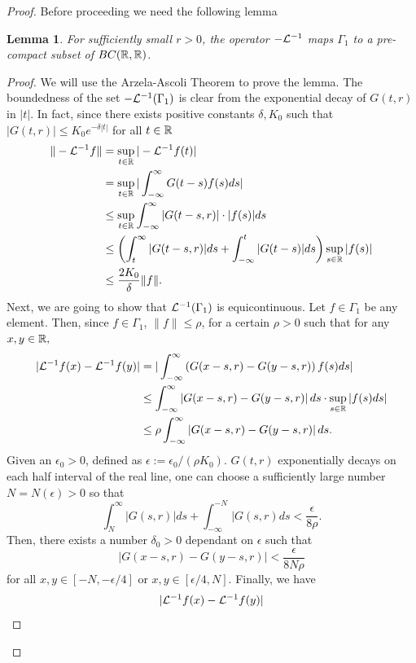 \documentclass[12pt,letterpaper]{amsart}
\newtheorem{lemma}[theorem]{Lemma}
\theoremstyle{definition}
\theoremstyle{remark}
\numberwithin{equation}{section}
\begin{document}
\begin{proof}
Before proceeding we need the following lemma

\begin{lemma}\label{lem compact}
	For sufficiently small $r>0$, the operator $-{\cal L}^{-1}$ maps $\Gamma_1$ to a pre-compact subset of $BC(\R,\R)$.
\end{lemma}
\begin{proof}
	We will use the Arzela-Ascoli Theorem to prove the lemma. The boundedness of the set $-{\cal L}^{-1}(\Gamma_1)$ is clear from the exponential decay of $G(t,r)$ in $|t|$. In fact, since there exists positive constants $\delta, K_0$ such that $|G(t,r)| \le K_0e^{-\delta |t|}$ for all $t\in\R$
	\begin{align*}
		\|-{\cal L}^{-1} f \| & = \sup_{t\in\R}| -{\cal L}^{-1} f(t) | \\
		&= \sup_{t\in\R}
		| \int^\infty_{-\infty} G(t-s)f(s)ds| \\
		& \le\sup_{t\in\R} \int^\infty_{-\infty} |G(t-s,r)|\cdot |f(s)|ds \\
		&\le  \left( \int^\infty_{t} |G(t-s,r)|ds   + \int^t_{-\infty} |G(t-s)|ds     \right)\sup_{s\in\R}|f(s)| \\
		&\le \frac{2K_0}{\delta} \| f\| .
	\end{align*}
	Next, we are going to show that ${\cal L}^{-1}(\Gamma_1)$ is equicontinuous. Let $f\in \Gamma_1$ be any element. Then, since $f\in \Gamma_1$, $\| f\| \le \rho$, for a certain $\rho >0$ such that for any $x,y \in \R,$
	\begin{align*}
		|{\cal L}^{-1}f(x)-{\cal L}^{-1}f(y)| &=| \int^\infty_{-\infty}\left( G(x-s,r)-G(y-s,r)\right) f(s)ds| \\
		&\le    \int^\infty_{-\infty}\left| G(x-s,r)-G(y-s,r)\right| ds \cdot \sup_{s\in\R}| f(s)ds| \\
		&\le \rho \int^\infty_{-\infty}\left| G(x-s,r)-G(y-s,r)\right| ds.
	\end{align*}
	Given an $\epsilon_0 >0$, defined as $\epsilon:= \epsilon_0/(\rho K_0)$. $G(t,r)$ exponentially decays on each half interval of the real line, one can choose a sufficiently large number $N=N(\epsilon) >0$ so that  
	$$
	\int^\infty _N |G(s,r)|ds +\int^{-N}_{-\infty} |G(s,r)ds < \frac{ \epsilon}{8\rho }.
	$$
	Then, there exists a number $\delta_0>0$ dependant on $\epsilon$ such that 
	$$
	\left| G(x-s,r)-G(y-s,r)\right| < \frac{\epsilon}{8N\rho}
	$$
	for all $x,y \in [-N, -\epsilon/4]$ or $x,y\in [\epsilon/4, N]$. Finally, we have
	\begin{align*}
		|{\cal L}^{-1}f(x)-{\cal L}^{-1}f(y)| 

\end{align*}
\end{proof}
\end{proof}
\end{document}

